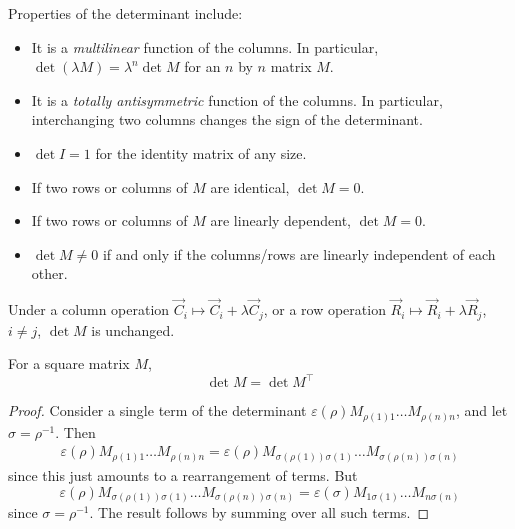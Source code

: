 \documentclass{../template/note}
\begin{document}
    Properties of the determinant include:

    \begin{itemize}
        \item It is a \emph{multilinear} function of the columns. In particular, \(\det(\lambda M) = \lambda^n \det M\) for an \(n\) by \(n\) matrix \(M\).
        \item It is a \emph{totally antisymmetric} function of the columns. In particular, interchanging two columns changes the sign of the determinant.
        \item \(\det I = 1\) for the identity matrix of any size.
        \item If two rows or columns of \(M\) are identical, \(\det M = 0\).
        \item If two rows or columns of \(M\) are linearly dependent, \(\det M = 0\).
        \item \(\det M \neq 0\) if and only if the columns/rows are linearly independent of each other.
    \end{itemize}
    
    \begin{corollary}
        Under a column operation \(\vec C_i \mapsto \vec C_i + \lambda \vec C_j\), or a row operation \(\vec R_i \mapsto \vec R_i + \lambda \vec R_j\), \(i \neq j\), \(\det M\) is unchanged.
    \end{corollary}
    
    \begin{proposition}
        For a square matrix \(M\),
        \[
            \det M = \det M^\intercal
        \]
    \end{proposition}
    
    \begin{proof}
        Consider a single term of the determinant \(\varepsilon(\rho) M_{\rho(1)1}\dots M_{\rho(n)n}\), and let \(\sigma = \rho^{-1}\). Then
        \begin{align*}
            \varepsilon(\rho)M_{\rho(1)1}\dots M_{\rho(n)n} = \varepsilon(\rho)M_{\sigma(\rho(1))\sigma(1)}\dots M_{\sigma(\rho(n))\sigma(n)}
        \end{align*}
        since this just amounts to a rearrangement of terms. But 
        \[
            \varepsilon(\rho)M_{\sigma(\rho(1))\sigma(1)}\dots M_{\sigma(\rho(n))\sigma(n)} = \varepsilon(\sigma)M_{1\sigma(1)}\dots M_{n\sigma(n)}
        \]
        since \(\sigma = \rho^{-1}\). The result follows by summing over all such terms.
    \end{proof}
    
\end{document}
